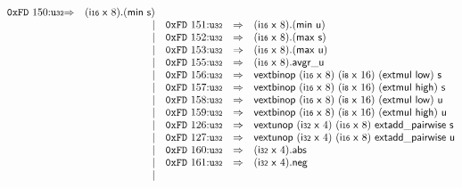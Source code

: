 $$\begin{array}{@{}l@{}rrlll@{}l@{}}
\mathtt{0xFD}~150{:}{\mathtt{u{\scriptstyle32}}} &\Rightarrow& (\mathsf{i{\scriptstyle16}}~\mathsf{x}~8) . (\mathsf{min}~\mathsf{s}) \\ &&|&
\mathtt{0xFD}~151{:}{\mathtt{u{\scriptstyle32}}} &\Rightarrow& (\mathsf{i{\scriptstyle16}}~\mathsf{x}~8) . (\mathsf{min}~\mathsf{u}) \\ &&|&
\mathtt{0xFD}~152{:}{\mathtt{u{\scriptstyle32}}} &\Rightarrow& (\mathsf{i{\scriptstyle16}}~\mathsf{x}~8) . (\mathsf{max}~\mathsf{s}) \\ &&|&
\mathtt{0xFD}~153{:}{\mathtt{u{\scriptstyle32}}} &\Rightarrow& (\mathsf{i{\scriptstyle16}}~\mathsf{x}~8) . (\mathsf{max}~\mathsf{u}) \\ &&|&
\mathtt{0xFD}~155{:}{\mathtt{u{\scriptstyle32}}} &\Rightarrow& (\mathsf{i{\scriptstyle16}}~\mathsf{x}~8) . \mathsf{avgr\_u} \\ &&|&
\mathtt{0xFD}~156{:}{\mathtt{u{\scriptstyle32}}} &\Rightarrow& \mathsf{vextbinop}~(\mathsf{i{\scriptstyle16}}~\mathsf{x}~8)~(\mathsf{i{\scriptstyle8}}~\mathsf{x}~16)~(\mathsf{extmul}~\mathsf{low})~\mathsf{s} \\ &&|&
\mathtt{0xFD}~157{:}{\mathtt{u{\scriptstyle32}}} &\Rightarrow& \mathsf{vextbinop}~(\mathsf{i{\scriptstyle16}}~\mathsf{x}~8)~(\mathsf{i{\scriptstyle8}}~\mathsf{x}~16)~(\mathsf{extmul}~\mathsf{high})~\mathsf{s} \\ &&|&
\mathtt{0xFD}~158{:}{\mathtt{u{\scriptstyle32}}} &\Rightarrow& \mathsf{vextbinop}~(\mathsf{i{\scriptstyle16}}~\mathsf{x}~8)~(\mathsf{i{\scriptstyle8}}~\mathsf{x}~16)~(\mathsf{extmul}~\mathsf{low})~\mathsf{u} \\ &&|&
\mathtt{0xFD}~159{:}{\mathtt{u{\scriptstyle32}}} &\Rightarrow& \mathsf{vextbinop}~(\mathsf{i{\scriptstyle16}}~\mathsf{x}~8)~(\mathsf{i{\scriptstyle8}}~\mathsf{x}~16)~(\mathsf{extmul}~\mathsf{high})~\mathsf{u} \\ &&|&
\mathtt{0xFD}~126{:}{\mathtt{u{\scriptstyle32}}} &\Rightarrow& \mathsf{vextunop}~(\mathsf{i{\scriptstyle32}}~\mathsf{x}~4)~(\mathsf{i{\scriptstyle16}}~\mathsf{x}~8)~\mathsf{extadd\_pairwise}~\mathsf{s} \\ &&|&
\mathtt{0xFD}~127{:}{\mathtt{u{\scriptstyle32}}} &\Rightarrow& \mathsf{vextunop}~(\mathsf{i{\scriptstyle32}}~\mathsf{x}~4)~(\mathsf{i{\scriptstyle16}}~\mathsf{x}~8)~\mathsf{extadd\_pairwise}~\mathsf{u} \\ &&|&
\mathtt{0xFD}~160{:}{\mathtt{u{\scriptstyle32}}} &\Rightarrow& (\mathsf{i{\scriptstyle32}}~\mathsf{x}~4) . \mathsf{abs} \\ &&|&
\mathtt{0xFD}~161{:}{\mathtt{u{\scriptstyle32}}} &\Rightarrow& (\mathsf{i{\scriptstyle32}}~\mathsf{x}~4) . \mathsf{neg} \\ &&|&

\end{array}$$
